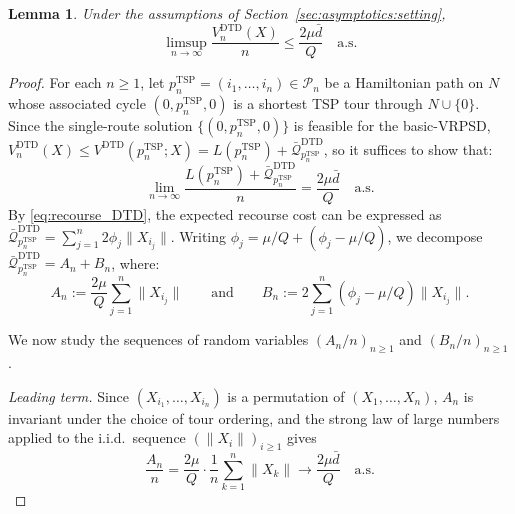 \documentclass{article}
\newtheorem{lemma}{Lemma}
\begin{document}
{\begin{lemma}\label{lem:asymptotic_ub}
Under the assumptions of Section~\ref{sec:asymptotics:setting},
\begin{equation}\label{eq:upper_bound}
    \limsup_{n \to \infty} \frac{V^{\text{DTD}}_n(X)}{n} \leq \frac{2\mu\bar d}{Q} \quad \text{a.s.}
\end{equation}
\end{lemma}
\begin{proof}
For each $n \geq 1$, let $p^{\text{TSP}}_n = (i_1, \dots, i_n) \in 
\mathcal{P}_n$ be a Hamiltonian path on $N$ whose associated cycle 
$(0, p^{\text{TSP}}_n, 0)$ is a shortest TSP tour through $N \cup \{0\}$. 
Since the single-route solution $\{(0, p^{\text{TSP}}_n, 0)\}$ is feasible 
for the basic-VRPSD, $V^{\text{DTD}}_n(X) \leq V^{\text{DTD}}(p^{\text{TSP}}_n; X) = L(p^{\text{TSP}}_n) + \bar{\mathcal{Q}}^{\text{DTD}}_{p^{\text{TSP}}_n}$, 
so it suffices to show that:
\begin{equation}\label{eq:upper_goal}
    \lim_{n \to \infty} \frac{ L(p^{\text{TSP}}_n) + \bar{\mathcal{Q}}^{\text{DTD}}_{p^{\text{TSP}}_n} }{n} 
     =  \frac{2\mu\bar d}{Q} \quad \text{a.s.}
\end{equation}
By \eqref{eq:recourse_DTD}, the expected recourse cost can be expressed as $\bar{\mathcal{Q}}^{\text{DTD}}_{p^{\text{TSP}}_n} = \sum_{j=1}^n 2\phi_j \|X_{i_j}\|$. Writing $\phi_j = \mu/Q + (\phi_j - \mu/Q)$, we decompose $\bar{\mathcal{Q}}^{\text{DTD}}_{p^{\text{TSP}}_n} = A_n + B_n$, where:
\begin{equation}\label{eq:DTD_TSP_decomp}
    A_n := \frac{2\mu}{Q} \sum_{j=1}^n \|X_{i_j}\|
    \qquad \text{and} \qquad 
    B_n := 2 \sum_{j=1}^n (\phi_j - \mu/Q) \|X_{i_j}\|.
\end{equation}

We now study the sequences of random variables $(A_n/n)_{n \geq 1}$ and $(B_n/n)_{n \geq 1}$.

\emph{Leading term.} Since $(X_{i_1}, \dots, X_{i_n})$ is a permutation 
of $(X_1, \dots, X_n)$, $A_n$ is invariant under the choice of tour 
ordering, and the strong law of large numbers applied to the i.i.d.\ sequence $(\|X_i\|)_{i \geq 1}$ 
gives
\[
    \frac{A_n}{n} = \frac{2\mu}{Q} \cdot \frac{1}{n} \sum_{k=1}^n \|X_k\| 
    \longrightarrow \frac{2\mu\bar d}{Q} \quad \text{a.s.}
\]


\end{proof}}
\end{document}

